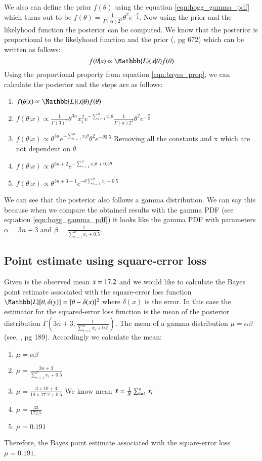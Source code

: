 We also can define the prior $f(\theta)$ using the equation \ref{eqn:hogg_gamma_pdf} which turns out to be $f(\theta) = \frac{1}{\Gamma(\alpha)2^3}\theta^2 e^{-\frac{\theta}{2}}$. Now using the prior and the likelyhood function the posterior can be computed. We know that the posterior  is proportional to the likelyhood function and the prior (\cite{hogg:2005}, pg 672) which can be written as follows:
\begin{equation} \label{eqn:bayes_prop}
    f(\theta|x) \propto \Mathbb{L}(x|\theta) f(\theta)
\end{equation}
Using the proportional property from equation \ref{eqn:bayes_prop}, we can calculate the posterior and the steps are as follows:
\begin{enumerate}
    \item $f(\theta|x) \propto \Mathbb{L}(x|\theta)f(\theta)$
    \item $f(\theta|x) \propto \frac{1}{\Gamma(3)^n} \theta^{3n} x_i^{2} e^{-\sum_{i=1}^{n}x_i\theta} \frac{1}{\Gamma(\alpha)2^3}\theta^2 e^{-\frac{\theta}{2}}$
    \item $f(\theta|x) \propto  \theta^{3n} e^{-\sum_{i=1}^{n}x_i\theta} \theta^2 e^{-\theta0.5}$ Removing all the constants and x which are not dependent on $\theta$
     \item $f(\theta|x) \propto  \theta^{3n+2} e^{-\sum_{i=1}^{n}x_i\theta +0.5\theta}$ 
    \item $f(\theta|x) \propto  \theta^{3n+3-1} e^{-\theta \sum_{i=1}^{n}x_i +0.5}$  
\end{enumerate}
We can see that the posterior also follows a gamma distribution. We can say this because when we compare the obtained results with the gamma PDF (see equation \ref{eqn:hogg_gamma_pdf}) it looks like the gamma PDF with parameters $\alpha=3n+3$ and $\beta=\frac{1}{\sum_{i=1}^{n}x_i +0.5}$. 

\subsection{Point estimate using square-error loss}
Given is the observed mean $\Bar{x} = 17.2$ and we would like to calculate the Bayes point estimate associated with the square-error loss function $\Mathbb{L}[\theta, \delta(y)] = [\theta - \delta(x)]^2$ where $\delta(x)$ is the error. In this case the estimator for the squared-error loss function is the mean of the posterior distribution $\Gamma(3n+3, \frac{1}{\sum_{i=1}^{n}x_i +0.5})$. The mean of a gamma distribution $\mu = \alpha\beta$ (see, \cite{hogg:2005}, pg 189). Accordingly we calculate the mean:
\begin{enumerate}
    \item $\mu = \alpha\beta$
    \item $\mu = \frac{3n+3}{\sum_{i=1}^{n}x_i +0.5}$
    \item $ \mu = \frac{3\times10 + 3}{10\times 17.2 +0.5}$ We know mean $\Bar{x} = \frac{1}{N}\sum_{i=1}^{n}x_i$
    \item $ \mu = \frac{33}{172.5}$
    \item $ \mu = 0.191$
\end{enumerate}
Therefore, the Bayes point estimate associated with the square-error loss $\mu = 0.191$.
